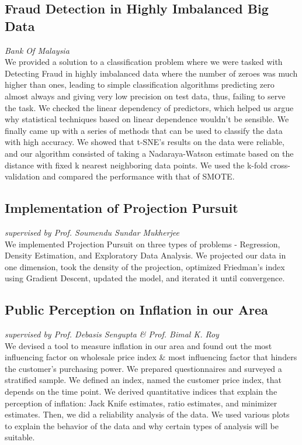 \documentclass[11pt,a4paper]{article}
\begin{document}
\subsection{Fraud Detection in Highly Imbalanced Big Data}
\textit{Bank Of Malaysia}\\
We provided a solution to a classification problem where we were tasked with Detecting Fraud in highly imbalanced data where the number of zeroes was much higher than ones, leading to simple classification algorithms predicting zero almost always and giving very low precision on test data, thus, failing to serve the task. We checked the linear dependency of predictors, which helped us argue why statistical techniques based on linear dependence wouldn't be sensible. We finally came up with a series of methods that can be used to classify the data with high accuracy. We showed that t-SNE's results on the data were reliable, and our algorithm consisted of taking a Nadaraya-Watson estimate based on the distance with fixed k nearest neighboring data points. We used the k-fold cross-validation and compared the performance with that of SMOTE.

\subsection{Implementation of Projection Pursuit}
\textit{supervised by Prof. Soumendu Sundar Mukherjee}\\
We implemented Projection Pursuit on three types of problems - Regression, Density Estimation, and Exploratory Data Analysis. We projected our data in one dimension, took the density of the projection, optimized Friedman's index using Gradient Descent, updated the model, and iterated it until convergence.

\subsection{Public Perception on Inflation in our Area}
\textit{supervised by Prof. Debasis Sengupta \& Prof. Bimal K. Roy}\\
We devised a tool to measure inflation in our area and found out the most influencing factor on wholesale price index \& most influencing factor that hinders the customer's purchasing power. We prepared questionnaires and surveyed a stratified sample. We defined an index, named the customer price index, that depends on the time point. We derived quantitative indices that explain the perception of inflation: Jack Knife estimates, ratio estimates, and minimizer estimates. Then, we did a reliability analysis of the data. We used various plots to explain the behavior of the data and why certain types of analysis will be suitable.
\end{document}

